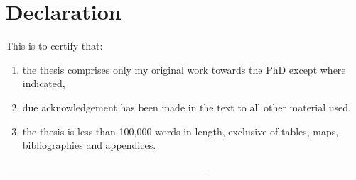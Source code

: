 \chapter*{Declaration}

This is to certify that:
\begin{enumerate}
\item \noindent the thesis comprises only my original work towards the PhD
except where indicated, 
\item \noindent due acknowledgement has been made in the text to all other
material used,
\item \noindent the thesis is less than 100,000 words in length, exclusive
of tables, maps, bibliographies and appendices.\vspace{2cm}

\end{enumerate}
\_\_\_\_\_\_\_\_\_\_\_\_\_\_\_\_\_\_\_\_\_\_\_\_\_\_\_

